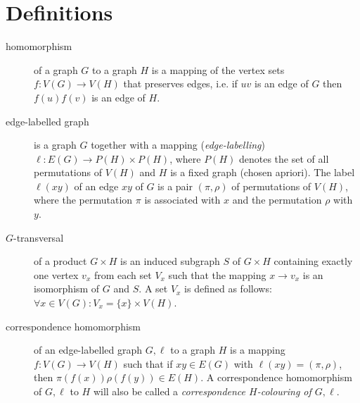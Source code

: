 \documentclass{fit-teorsem}
\begin{document}
\maketsheader
\thispagestyle{empty}

\section*{Definitions}

\begin{description}
	\item[homomorphism] of a graph $G$ to a graph $H$ is a mapping of the vertex sets $f : V(G) \to V(H)$ 
		that preserves edges, i.e. if $uv$ is an edge of $G$ then $f(u)f(v)$ is an edge of $H$.
	\item[edge-labelled graph] is a graph $G$ together with a mapping (\textit{edge-labelling})
		$\ell : E(G) \to P(H) \times P(H)$, where $P(H)$ denotes the set of all permutations of $V(H)$ 
		and $H$ is a fixed graph (chosen apriori). The label $\ell(xy)$ of an edge $xy$ of $G$ is a pair
		$(\pi, \rho)$ of permutations of $V(H)$, where the permutation $\pi$ is associated with $x$ and
		the permutation $\rho$ with $y$.
	\item[$G$-transversal] of a product $G \times H$ is an induced subgraph $S$ of $G \times H$
		containing exactly one vertex $v_x$ from each set $V_x$ such that the mapping $x \to v_x$
		is an isomorphism of $G$ and $S$. A set $V_x$ is defined as follows:
		$\forall x \in V(G): V_x = \{x\} \times V(H)$.
	\item[correspondence homomorphism] of an edge-labelled graph $G, \ell$ to a graph $H$ is a mapping
		\hbox{$f : V(G) \to V(H)$} such that if $xy \in E(G)$ with $\ell(xy) = (\pi, \rho)$,
		then $\pi(f(x)) \rho(f(y)) \in E(H)$. A correspondence homomorphism of $G, \ell$ to $H$
		will also be called a \textit{correspondence $H$-colouring of $G, \ell$}.

		\begin{center}
\end{center}
\end{description}
\end{document}
